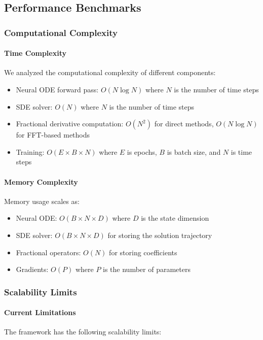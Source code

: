 \subsection{Performance Benchmarks}

\subsubsection{Computational Complexity}

\paragraph{Time Complexity}
We analyzed the computational complexity of different components:

\begin{itemize}
    \item Neural ODE forward pass: $O(N \log N)$ where $N$ is the number of time steps
    \item SDE solver: $O(N)$ where $N$ is the number of time steps
    \item Fractional derivative computation: $O(N^2)$ for direct methods, $O(N \log N)$ for FFT-based methods
    \item Training: $O(E \times B \times N)$ where $E$ is epochs, $B$ is batch size, and $N$ is time steps
\end{itemize}

\paragraph{Memory Complexity}
Memory usage scales as:

\begin{itemize}
    \item Neural ODE: $O(B \times N \times D)$ where $D$ is the state dimension
    \item SDE solver: $O(B \times N \times D)$ for storing the solution trajectory
    \item Fractional operators: $O(N)$ for storing coefficients
    \item Gradients: $O(P)$ where $P$ is the number of parameters
\end{itemize}

\subsubsection{Scalability Limits}

\paragraph{Current Limitations}
The framework has the following scalability limits:

